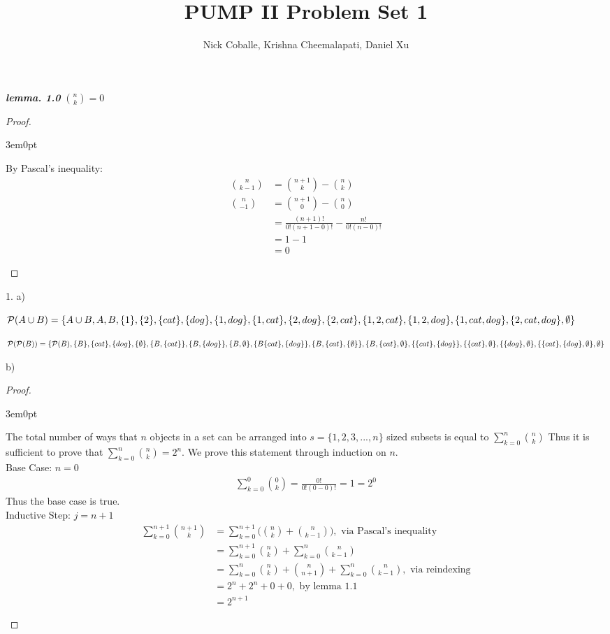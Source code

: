 \documentclass[11pt]{article}
\title{PUMP II Problem Set 1}
\author{Nick Coballe, Krishna Cheemalapati, Daniel Xu}
\newcommand{\bproof}{\begin{proof}
$ $ \\
\begin{adjustwidth}{3em}{0pt}
}
\newcommand{\eproof}{\end{adjustwidth}
\end{proof}}
\begin{document}
\maketitle
\begin{flushleft}

\emph{\textbf{lemma. 1.0}} ${n \choose k} = 0$
\bproof
By Pascal's inequality:
\begin{align*}
{n \choose k-1} & = {n+1 \choose k} - {n \choose k} \\
{n \choose -1} & = {n+1 \choose 0} - {n \choose 0} \\
& = \frac{(n+1)!}{0!(n+1-0)!} - \frac{n!}{0!(n-0)!} \\
& = 1 - 1 \\
& = 0
\end{align*}
\eproof

1. a)\bigskip



$\mathcal{P}(A \cup B)= \{ A \cup B, A, B, \{ 1 \}, \{ 2 \}, \{ cat \}, \{ dog \}, \{ 1, dog \}, \{ 1, cat \}, \linebreak \{ 2, dog \}, \{ 2, cat \}, \{ 1, 2, cat \}, \{ 1, 2, dog \}, \{ 1, cat, dog \}, \{ 2, cat ,dog \}, \emptyset \}$
\bigskip

$ \mathcal{P} (\mathcal{P} (B)) = \{ \mathcal{P} (B), \{ B \}, \{ cat \}, \{ dog \}, \{ \emptyset \} , \{ B, \{ cat \} \},  \{B, \{ dog \} \}, \{ B, \emptyset \}, \linebreak \{ B \{ cat \}, \{ dog \} \}, \{ B, \{ cat \}, \{ \emptyset \} \}, \{ B, \{ cat \}, \emptyset \}, \{ \{ cat \}, \{ dog \} \}, \{ \{ cat \}, \emptyset \}, \linebreak \{ \{ dog \}, \emptyset \}, \{ \{ cat \}, \{ dog \}, \emptyset \}, \emptyset \}  $

\newpage

b) \bigskip

\bproof
The total number of ways that $n$ objects in a set can be arranged into $s = \{1, 2, 3,..., n\}$ sized subsets is equal to $\sum\limits_{k=0}^n {n \choose k}$ Thus it is sufficient to prove that $\sum\limits_{k=0}^n {n \choose k} = 2^n$. We prove this statement through induction on $n$. \\
Base Case: $n = 0$ \\
\begin{align*}
\sum\limits_{k=0}^0 {0 \choose k} = \frac{0!}{0!(0-0)!} = 1 = 2^0
\end{align*}
Thus the base case is true.\\
Inductive Step: $j=n+1$ \\
\begin{align*}
\sum\limits_{k=0}^{n+1} {n+1 \choose k} & = \sum\limits_{k=0}^{n+1} \Bigg({n \choose k}+ {n \choose k-1}\Bigg), \text{ via Pascal's inequality} \\
& = \sum\limits_{k=0}^{n+1} {n \choose k} + \sum\limits_{k=0}^n {n \choose k-1} \\
& = \sum\limits_{k=0}^n {n \choose k} + {n \choose n+1} + \sum\limits_{k=0}^n {n \choose k-1}, \text{ via reindexing} \\
& = 2^n + 2^n + 0 + 0, \text{ by lemma 1.1} \\
& = 2^{n+1}
\end{align*}
\eproof


\end{flushleft}
\end{document}
